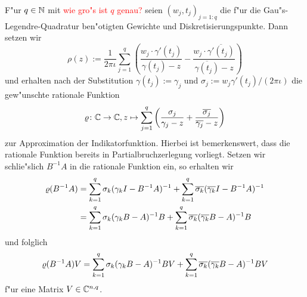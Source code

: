 F"ur $q\in\mathbb{N}$ mit \textcolor{red}{wie gro"s ist $q$ genau?} seien $(w_j, t_j)_{j=1:q}$
die f"ur die Gau"s-Legendre-Quadratur ben"otigten Gewichte und Diskretisierungspunkte.
Dann setzen wir
\[
\rho(z) := \frac{1}{2\pi\iota}\sum_{j=1}^q \left(
\frac{w_j \cdot \gamma'(t_j)}{\gamma(t_j)-z} - \frac{w_j \cdot \overline{\gamma'(t_j)}}{\overline{\gamma(t_j)}-z}
\right)
\]
und erhalten nach der Substitution $\gamma(t_j) := \gamma_j$ und
$\sigma_j := w_j \gamma'(t_j) / (2\pi\iota)$ die gew"unschte rationale
Funktion
\[
\varrho\colon\mathbb{C}\to\mathbb{C}, z\mapsto\sum_{j=1}^q\left(\frac{\sigma_j}{\gamma_j - z} +
\frac{\overline{\sigma_j}}{\overline{\gamma_j} - z}\right)
\]
zur Approximation der Indikatorfunktion. Hierbei ist bemerkenswert, dass die
rationale Funktion bereits in Partialbruchzerlegung vorliegt. Setzen wir schlie"slich $B^{-1}A$ in die
rationale Funktion ein, so erhalten wir
\begin{align*}
\varrho(B^{-1}A) &= \sum_{k=1}^q \sigma_k (\gamma_k I - B^{-1}A)^{-1} +
\sum_{k=1}^q \overline{\sigma_k} (\overline{\gamma_k} I - B^{-1}A)^{-1}\\
&= \sum_{k=1}^q \sigma_k (\gamma_k B - A)^{-1} B +
\sum_{k=1}^q \overline{\sigma_k} (\overline{\gamma_k} B - A)^{-1} B
\end{align*}
und folglich
\[
\varrho(B^{-1}A)V =
\sum_{k=1}^q \sigma_k (\gamma_k B - A)^{-1} BV +
\sum_{k=1}^q \overline{\sigma_k} (\overline{\gamma_k} B - A)^{-1} BV
\]
f"ur eine Matrix $V\in\mathbb{C}^{n,q}$.


